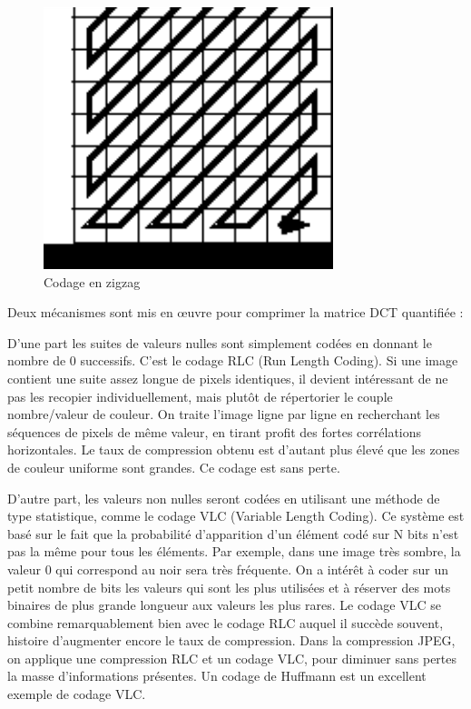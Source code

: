 \documentclass[a4paper,10pt]{article}
\begin{document}
\begin{figure}[htbp]
\begin{center}
	\includegraphics{zigzag.pdf}
\caption{Codage en zigzag}
\label{default}
\end{center}
\end{figure}

Deux mécanismes sont mis en \oe uvre pour comprimer la matrice DCT quantifiée :

D'une part les suites de valeurs nulles sont simplement codées en donnant le nombre de 0 successifs. C'est le codage RLC (Run Length Coding). Si une image contient une suite assez longue de pixels identiques, il devient intéressant de ne pas les recopier individuellement, mais plutôt de répertorier le couple nombre/valeur de couleur. On traite l'image ligne par ligne en recherchant les séquences de pixels de même valeur, en tirant profit des fortes corrélations horizontales. Le taux de compression obtenu est d'autant plus élevé que les zones de couleur uniforme sont grandes. Ce codage est sans perte.

D'autre part, les valeurs non nulles seront codées en utilisant une méthode de type statistique, comme le codage VLC (Variable Length Coding). Ce système est basé sur le fait que la probabilité d'apparition d'un élément codé sur N bits n'est pas la même pour tous les éléments. Par exemple, dans une image très sombre, la valeur 0 qui correspond au noir sera très fréquente. On a intérêt à coder sur un petit nombre de bits les valeurs qui sont les plus utilisées et à réserver des mots binaires de plus grande longueur aux valeurs les plus rares. Le codage VLC se combine remarquablement bien avec le codage RLC auquel il succède souvent, histoire d'augmenter encore le taux de compression. Dans la compression JPEG, on applique une compression RLC et un codage VLC, pour diminuer sans pertes la masse d'informations présentes. Un codage de Huffmann est un excellent exemple de codage VLC.
\end{document}
